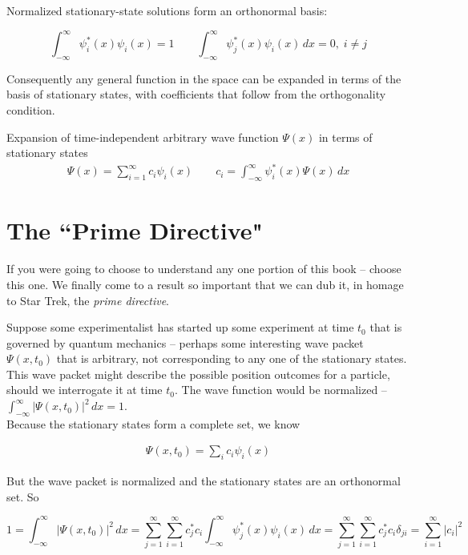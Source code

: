 Normalized stationary-state solutions form an orthonormal basis: 

\[
\boxed{ \int_{-\infty}^{\infty} \psi_i^*(x) \psi_i(x) = 1 \qquad
\int_{-\infty}^{\infty} \psi_j^*(x)\psi_i(x) \, dx = 0, \; i\neq j }
\] \vspace{3px}

Consequently any general function in the space can be expanded in terms of the
basis of stationary states, with coefficients that follow from the
orthogonality condition. 

\begin{mainbox}{Expansion of time-independent arbitrary wave function $\Psi(x)$ in terms of
  stationary states}
  \begin{align} \label{ci}
    \Psi(x) = \sum_{i=1}^\infty c_i \psi_i(x) \qquad c_i
    = \int_{-\infty}^{\infty} \psi_i^*(x) \Psi(x) \, dx
  \end{align} 
\end{mainbox}

\section{The ``Prime Directive"}

If you were going to choose to understand any one portion of this book -- choose this
one. We finally come to a result so important that we can dub it, in homage to
Star Trek, the \textit{prime directive}. 

Suppose some experimentalist has started up some experiment at time $t_0$ that
is governed by quantum mechanics -- perhaps some interesting wave packet
$\Psi(x, t_0)$ that is arbitrary, not corresponding to any one of the
stationary states. This wave packet might describe the possible position
outcomes for a particle, should we interrogate it at time $t_0$. The wave
function would be normalized -- $\int_{-\infty}^{\infty}  |\Psi(x, t_0)|^2 \,
dx = 1$. \\

Because the stationary states form a complete set, we know 

\begin{align} \label{eq_5}
\Psi(x, t_0) = \sum_i c_i \psi_i(x)
\end{align} \vspace{3px}

But the wave packet is normalized and the stationary states are an orthonormal
set. So 

\[
  1 = \int_{-\infty}^{\infty}  |\Psi(x, t_0)|^2 \, dx = \sum_{j=1}^\infty
  \sum_{i=1}^\infty c_j^* c_i \int_{-\infty}^{\infty} \psi_j^*(x) \psi_i(x) \,
  dx = \sum_{j=1}^\infty \sum_{i=1}^\infty c_j^* c_i \delta_{ji}
  = \sum_{i=1}^\infty |c_i|^2
\] \vspace{3px}

